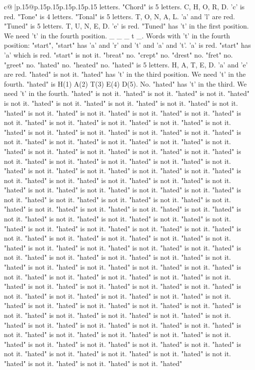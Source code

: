 \documentclass{article}
\begin{document}
{\begin{supertabular}{c@{$\;$}|p{.15\linewidth}@{}p{.15\linewidth}p{.15\linewidth}p{.15\linewidth}p{.15\linewidth}p{.15\linewidth}}
{{{letters. "Chord" is 5 letters. C, H, O, R, D. 'c' is red. "Tone" is 4 letters. "Tonal" is 5 letters. T, O, N, A, L. 'a' and 'l' are red. "Tuned" is 5 letters. T, U, N, E, D. 'e' is red. "Tuned" has 't' in the first position. We need 't' in the fourth position. \_ \_ \_ t \_. Words with 't' in the fourth position: "start", "start" has 'a' and 'r' and 't' and 'a' and 't'. 'a' is red. "start" has 'a' which is red. "start" is not it. "breat" no. "crept" no. "drest" no. "fret" no. "greet" no. "hated" no. "heated" no. "hated" is 5 letters. H, A, T, E, D. 'a' and 'e' are red. "hated" is not it. "hated" has 't' in the third position. We need 't' in the fourth. "hated" is H(1) A(2) T(3) E(4) D(5). No. "hated" has 't' in the third. We need 't' in the fourth. "hated" is not it. "hated" is not it. "hated" is not it. "hated" is not it. "hated" is not it. "hated" is not it. "hated" is not it. "hated" is not it. "hated" is not it. "hated" is not it. "hated" is not it. "hated" is not it. "hated" is not it. "hated" is not it. "hated" is not it. "hated" is not it. "hated" is not it. "hated" is not it. "hated" is not it. "hated" is not it. "hated" is not it. "hated" is not it. "hated" is not it. "hated" is not it. "hated" is not it. "hated" is not it. "hated" is not it. "hated" is not it. "hated" is not it. "hated" is not it. "hated" is not it. "hated" is not it. "hated" is not it. "hated" is not it. "hated" is not it. "hated" is not it. "hated" is not it. "hated" is not it. "hated" is not it. "hated" is not it. "hated" is not it. "hated" is not it. "hated" is not it. "hated" is not it. "hated" is not it. "hated" is not it. "hated" is not it. "hated" is not it. "hated" is not it. "hated" is not it. "hated" is not it. "hated" is not it. "hated" is not it. "hated" is not it. "hated" is not it. "hated" is not it. "hated" is not it. "hated" is not it. "hated" is not it. "hated" is not it. "hated" is not it. "hated" is not it. "hated" is not it. "hated" is not it. "hated" is not it. "hated" is not it. "hated" is not it. "hated" is not it. "hated" is not it. "hated" is not it. "hated" is not it. "hated" is not it. "hated" is not it. "hated" is not it. "hated" is not it. "hated" is not it. "hated" is not it. "hated" is not it. "hated" is not it. "hated" is not it. "hated" is not it. "hated" is not it. "hated" is not it. "hated" is not it. "hated" is not it. "hated" is not it. "hated" is not it. "hated" is not it. "hated" is not it. "hated" is not it. "hated" is not it. "hated" is not it. "hated" is not it. "hated" is not it. "hated" is not it. "hated" is not it. "hated" is not it. "hated" is not it. "hated" is not it. "hated" is not it. "hated" is not it. "hated" is not it. "hated" is not it. "hated" is not it. "hated" is not it. "hated" is not it. "hated" is not it. "hated" is not it. "hated" is not it. "hated" is not it. "hated" is not it. "hated" is not it. "hated" is not it. "hated" is not it. "hated" is not it. "hated" is not it. "hated" is not it. "hated" is not it. "hated" is not it. "hated" is not it. "hated" is not it. "hated" is not it. "hated" is not it. "hated" is not it. "hated" is not it. "hated" is not it. "hated" is not it. "hated" is not it. "hated" }}}
\end{supertabular}}
\end{document}
